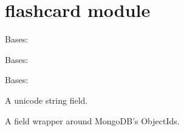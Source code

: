 \documentclass[letterpaper,10pt,english]{sphinxmanual}
\begin{document}
\chapter{flashcard module}
\label{\detokenize{flashcard:flashcard-module}}\label{\detokenize{flashcard::doc}}\label{\detokenize{flashcard:module-flashcard}}

\begin{fulllineitems}
\label{\detokenize{flashcard:flashcard.Flashcard}}
Bases: 

\begin{fulllineitems}
\label{\detokenize{flashcard:flashcard.Flashcard.DoesNotExist}}
Bases: 

\end{fulllineitems}


\begin{fulllineitems}
\label{\detokenize{flashcard:flashcard.Flashcard.MultipleObjectsReturned}}
Bases: 

\end{fulllineitems}


\begin{fulllineitems}
\label{\detokenize{flashcard:flashcard.Flashcard.answer}}
A unicode string field.

\end{fulllineitems}


\begin{fulllineitems}
\label{\detokenize{flashcard:flashcard.Flashcard.id}}
A field wrapper around MongoDB's ObjectIds.

\end{fulllineitems}


\end{fulllineitems}
\end{document}
